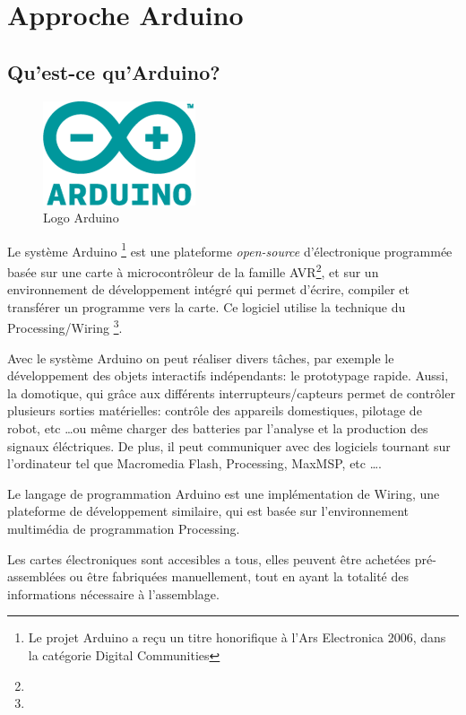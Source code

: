 \chapter[Approche Arduino]{Approche Arduino}
\label{chap:chap2}

\section{Qu'est-ce qu'Arduino?}

\begin{figure}[h]
\begin{center}
\includegraphics[scale=0.4]{figure/Arduino/Arduinologo.png}
\caption{Logo Arduino}
\end{center}
\end{figure}

Le système Arduino \footnote{Le projet Arduino a reçu un titre honorifique à l'Ars Electronica 2006, dans la catégorie Digital Communities} 
est une plateforme \textit{open-source} d'électronique programmée basée sur une carte à microcontrôleur de la famille AVR\footnote{}, et sur un environnement
de développement intégré qui permet d'écrire, compiler et transférer un programme vers la carte. Ce logiciel utilise la technique du Processing/Wiring
\footnote{}.

Avec le système Arduino on peut réaliser divers tâches, par exemple le développement des objets interactifs indépendants: le prototypage rapide. Aussi,  
la domotique, qui grâce aux différents interrupteurs/capteurs permet de contrôler plusieurs sorties matérielles: contrôle des appareils domestiques, 
pilotage de robot, etc \ldots ou même charger des batteries par l'analyse et la production des signaux éléctriques. 
De plus, il peut communiquer avec des logiciels tournant sur l'ordinateur tel que Macromedia Flash, Processing, MaxMSP, etc \ldots.

Le langage de programmation Arduino est une implémentation de Wiring, une plateforme de développement similaire, qui est basée sur l'environnement 
multimédia de programmation Processing.

Les cartes électroniques sont accesibles a tous, elles peuvent être achetées pré-assemblées ou être fabriquées manuellement, tout en ayant la totalité des
informations nécessaire à l'assemblage.

